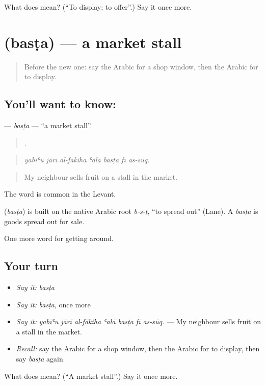 \begin{tcolorbox}[breakable,colback=teal!4,colframe=teal!35!black,title={Before you move on}]
What does  mean? (\textquotedblleft{}To display; to offer\textquotedblright{}.) Say it once more.
\end{tcolorbox}
\section[\texorpdfstring{\ar{بسطة} (basṭa)}{بسطة (basṭa)}]{ (basṭa) — a market stall}

\label{lesson:AR-C455-basta}



\begin{quote}
Before the new one: say the Arabic for a shop window, then the Arabic for to display.
\end{quote}

\subsection*{You'll want to know: }
\textbf{} — \emph{basṭa} — \textquotedblleft{}a market stall\textquotedblright{}.

\begin{quote}
      .
\end{quote}

\begin{quote}
\emph{yabīʿu jārī al-fākiha ʿalā basṭa fī as-sūq.}
\end{quote}

\begin{quote}
My neighbour sells fruit on a stall in the market.
\end{quote}

The word is common in the Levant.

\begin{cousinweb}
\textbf{} (\emph{basṭa}) is built on the native Arabic root \emph{b-s-ṭ}, \textquotedblleft{}to spread out\textquotedblright{} (Lane). A \emph{basṭa} is goods spread out for sale.
\end{cousinweb}

\begin{grammarlens}[title={What you've built}]
One more word for getting around.
\end{grammarlens}

\subsection*{Your turn}
\begin{itemize}
\raggedright
  \item \emph{Say it:} \emph{basṭa}
  \item \emph{Say it:} \emph{basṭa}, once more
  \item \emph{Say it:} \emph{yabīʿu jārī al-fākiha ʿalā basṭa fī as-sūq.} — My neighbour sells fruit on a stall in the market.
  \item \emph{Recall:} say the Arabic for a shop window, then the Arabic for to display, then say \emph{basṭa} again
\end{itemize}

\begin{tcolorbox}[breakable,colback=teal!4,colframe=teal!35!black,title={Before you move on}]
What does  mean? (\textquotedblleft{}A market stall\textquotedblright{}.) Say it once more.
\end{tcolorbox}
